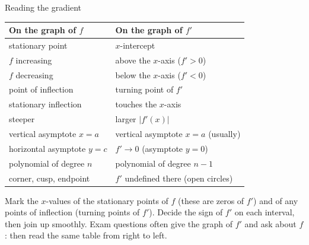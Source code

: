 \begin{cols}[0.53]
\begin{keyres}{Reading the gradient}
\small
\begin{tabular}{@{}p{3.75cm}p{4.45cm}@{}}
\textbf{On the graph of $f$} & \textbf{On the graph of $f'$} \\ \hline
stationary point & $x$-intercept \\
$f$ increasing & above the $x$-axis ($f'>0$) \\
$f$ decreasing & below the $x$-axis ($f'<0$) \\
point of inflection & turning point of $f'$ \\
stationary inflection & touches the $x$-axis \\
steeper & larger $|f'(x)|$ \\
vertical asymptote $x=a$ & vertical asymptote $x=a$ (usually) \\
horizontal asymptote $y=c$ & $f'\to0$ (asymptote $y=0$) \\
polynomial of degree $n$ & polynomial of degree $n-1$ \\
corner, cusp, endpoint & $f'$ undefined there (open circles) \\
\end{tabular}
\end{keyres}
\begin{tip}
Mark the $x$-values of the stationary points of $f$ (these are zeros of $f'$) and of any points of inflection (turning points of $f'$). Decide the sign of $f'$ on each interval, then join up smoothly. Exam questions often give the graph of $f'$ and ask about $f$: then read the same table from right to left.
\end{tip}
\nextcol[0.445]
\centering
{}


\end{cols}
